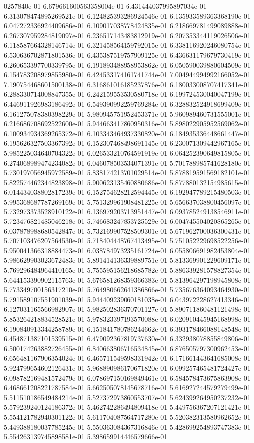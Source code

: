 0257840e-01	6.679661600563358004e-01	6.431444037995897034e-01	6.313078474895269521e-01	6.124825393286924546e-01	6.135933589363368190e-01	6.047272336924409686e-01	6.109017038778424835e-01	6.218669781499089888e-01	6.267307959284819097e-01	6.236517143483812919e-01	6.207353344119026506e-01	6.118587664328146714e-01	6.321458564159792015e-01	6.338116920246080754e-01	6.530636702871801536e-01	6.435387519757909125e-01	6.436631179679730419e-01	6.260653397700339795e-01	6.191893488958953862e-01	6.050590039880604509e-01	6.154783208979855980e-01	6.424533174161741744e-01	7.004944994992166052e-01	7.190754468601500138e-01	6.316861016185237876e-01	6.180033008707417341e-01	6.288330714008847355e-01	6.242159553530580718e-01	6.199724530040047199e-01	6.446911926983186492e-01	6.549390992259769284e-01	6.328832524918699409e-01	6.161275078380398229e-01	5.980945751952453371e-01	5.960989460731555001e-01	6.216686708692522600e-01	5.944663417860950316e-01	5.898022905952569062e-01	6.100934934369265372e-01	6.103343464937330820e-01	6.184935336448661447e-01	6.195626327503367392e-01	6.152307468498691145e-01	6.230071309442967165e-01	5.985225034640704322e-01	6.026533210764591919e-01	6.064252390649815805e-01	6.274068989474234082e-01	6.046078503534071391e-01	5.701788985741628180e-01	5.730197056945972589e-01	5.838174213701029514e-01	5.878819591569182101e-01	5.822574462344823898e-01	5.900623135460880686e-01	5.877880132154985615e-01	6.014434038802817239e-01	6.152754628212594445e-01	6.192947789215480503e-01	5.995368687787269169e-01	5.751329961908481225e-01	5.656637038800456097e-01	5.732973373528910122e-01	6.136979203713951447e-01	6.093785249138546911e-01	5.723476821485046218e-01	5.746683247853725529e-01	6.004745504020865265e-01	6.037878988680542847e-01	5.732169907528509301e-01	5.671962700036300431e-01	5.707103476207564530e-01	5.718404448767413495e-01	5.751052229698522256e-01	5.950041366318884473e-01	6.038784973235161724e-01	6.055806691982453804e-01	5.986629903023672483e-01	5.891414136339889751e-01	5.813369901229609171e-01	5.769296484964410165e-01	5.755595156218685782e-01	5.886339281578827354e-01	5.644153390902115763e-01	5.676581268359366383e-01	5.813964297198945808e-01	5.773349700156317210e-01	5.764980662641386866e-01	5.735676364093464930e-01	5.791589107551901039e-01	5.944409239060181038e-01	6.043972228627413346e-01	6.127031165566982907e-01	5.982502836370701127e-01	5.890711860481121498e-01	5.853264218834528521e-01	5.978323397193570088e-01	6.020910445945168998e-01	6.190840913344258789e-01	6.151841780786244662e-01	6.393178466088148548e-01	6.454871387101539515e-01	6.479092367819737630e-01	6.332938078855849806e-01	6.500174263882726455e-01	6.840663806716534845e-01	6.876505797300962453e-01	6.656481167906354024e-01	6.465711549598331942e-01	6.171661443641685008e-01	5.924799654602126431e-01	5.968890986170671820e-01	6.099257465481724427e-01	6.098782169481572479e-01	6.078697150169849461e-01	6.584578473675863908e-01	6.468661208221787584e-01	5.662505078145678716e-01	5.616927244579279499e-01	5.511510186549484214e-01	5.527372973860553707e-01	5.624399264950237232e-01	5.579239240124186372e-01	5.462742286494809418e-01	5.449756367207121421e-01	5.554121782940301122e-01	5.611704087564717280e-01	5.520382313580962652e-01	5.449388180037785245e-01	5.550363084367316846e-01	5.428699254893747383e-01	5.554263139745898581e-01	5.398659914446579666e-01